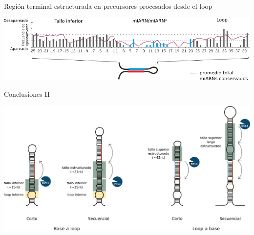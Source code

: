 \documentclass{beamer}
\begin{document}
\begin{frame}{Región terminal estructurada en precursores procesados desde el loop}
	\begin{center}
		\includegraphics[width=1\textwidth]{img/GR_fig4C.png}
	\end{center}
\end{frame}

\begin{frame}{Conclusiones II}
	\begin{center}
		\includegraphics[width=1\textwidth]{img/mecanismos.png}
	\end{center}
\end{frame}
\end{document}
